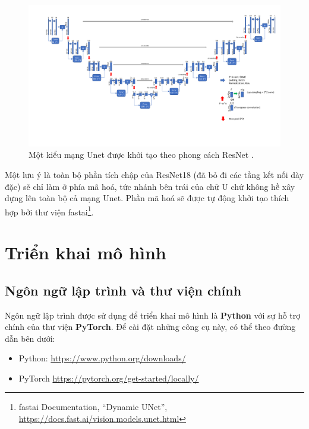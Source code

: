 \documentclass[a4paper, 12pt]{report}
\begin{document}
\begin{figure}[!h]
\captionsetup{width=0.8\textwidth}
\centering
\includegraphics[width=17cm]{images/unetresnet.png}
\caption{Một kiểu mạng Unet được khởi tạo theo phong cách ResNet \cite{unetwithresblocknishank2019}.}
\end{figure}

Một lưu ý là toàn bộ phần tích chập của ResNet18 (đã bỏ đi các tầng kết nối dày đặc) sẽ chỉ làm ở phía mã hoá, tức nhánh bên trái của chữ U chứ không hề xây dựng lên toàn bộ cả mạng Unet.
Phần mã hoá sẽ được tự động khởi tạo thích hợp bởi thư viện fastai\footnote{fastai Documentation, ``Dynamic UNet'', \href{https://docs.fast.ai/vision.models.unet.html}{https://docs.fast.ai/vision.models.unet.html}}.

\chapter{Triển khai mô hình}\label{implementation}

\section{Ngôn ngữ lập trình và thư viện chính}

Ngôn ngữ lập trình được sử dụng để triển khai mô hình là \textbf{Python} với sự hỗ trợ chính của thư viện \textbf{PyTorch}.
Để cài đặt những công cụ này, có thể theo đường dẫn bên dưới:

\begin{itemize}
    \item Python: \href{https://www.python.org/downloads/}{https://www.python.org/downloads/}
    \item PyTorch \href{https://pytorch.org/get-started/locally/}{https://pytorch.org/get-started/locally/}
\end{itemize}
\end{document}
